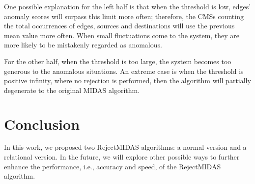 \documentclass[5p]{elsarticle}
\begin{document}
	One possible explanation for the left half is that when the threshold is low, edges' anomaly scores will surpass this limit more often; therefore, the CMSs counting the total occurrences of edges, sources and destinations will use the previous mean value more often. When small fluctuations come to the system, they are more likely to be mistakenly regarded as anomalous.

	For the other half, when the threshold is too large, the system becomes too generous to the anomalous situations. An extreme case is when the threshold is positive infinity, where no rejection is performed, then the algorithm will partially degenerate to the original MIDAS algorithm.


	\section{Conclusion}

	In this work, we proposed two RejectMIDAS algorithms: a normal version and a relational version. In the future, we will explore other possible ways to further enhance the performance, i.e., accuracy and speed, of the RejectMIDAS algorithm.

	
\end{document}
